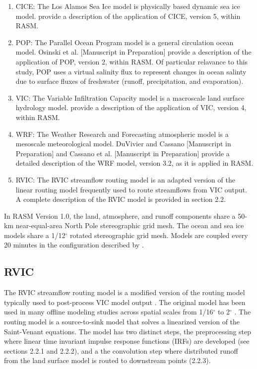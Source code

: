 \documentclass[ms, draft]{agutex}
\begin{document}
\begin{article}
\begin{enumerate}
\item CICE: The Los Alamos Sea Ice model \citep{Hunke_2010} is physically based dynamic sea ice model.
\citet{Roberts_2015b} provide a description of the application of CICE, version 5, within RASM.
\item POP: The Parallel Ocean Program model \citep{Smith_2010} is a general circulation ocean model.
Osinski et al. [Manuscript in Preparation] provide a description of the application of POP, version 2, within RASM.
Of particular relavance to this study, POP uses a virtual salinity flux to represent changes in ocean salinty due to surface fluxes of freshwater (runoff, precipitation, and evaporation).
\item VIC: The Variable Infiltration Capacity model \citep{Liang_1996} is a macroscale land surface hydrology model.
\citet{Hamman_2015} provide a description of the application of VIC, version 4, within RASM.
\item WRF: The Weather Research and Forecasting atmospheric model \citep{Skamarock_2007} is a mesoscale meteorological model.
DuVivier and Cassano [Manuscript in Preparation] and Cassano et al. [Manuscript in Preparation] provide a detailed description of the WRF model, version 3.2, as it is applied in RASM.
\item RVIC: The RVIC streamflow routing model is an adapted version of the \citet{Lohmann_1996} linear routing model frequently used to route streamflows from VIC output.
A complete description of the RVIC model is provided in section 2.2.
\end{enumerate}

In RASM Version 1.0, the land, atmosphere, and runoff components share a 50-km near-equal-area North Pole stereographic grid mesh.
The ocean and sea ice models share a 1/12$^{\circ}$ rotated stereographic grid mesh.
Models are coupled every 20 minutes in the configuration described by \citet{Roberts_2015a}.

\subsection{RVIC}

The RVIC streamflow routing model is a modified version of the routing model typically used to post-process VIC model output \citep{Lohmann_1996, Lohmann_1998a}.
The original \citet{Lohmann_1996} model has been used in many offline modeling studies across spatial scales from 1/16$^{\circ}$ to 2$^{\circ}$ \citep[.e.g.][]{Nijssen_1997,Lohmann_1998b,Su_2005}.
The routing model is a source-to-sink model that solves a linearized version of the Saint-Venant equations.
The model has two distinct steps, the preprocessing step where linear time invariant impulse response functions (IRFs) are developed (see sections 2.2.1 and 2.2.2), and a the convolution step where distributed runoff from the land surface model is routed to downstream points (2.2.3).


\end{article}
\end{document}

